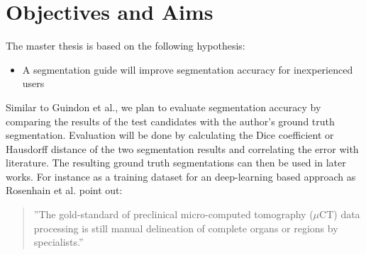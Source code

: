 \section{Objectives and Aims}
\begin{body}
	The master thesis is based on the following hypothesis:
	\begin{itemize}
		\item A segmentation guide will improve segmentation accuracy for inexperienced users
	\end{itemize}
	Similar to Guindon et al.\cite{diceMeasuresAmountEcologic1945}, we plan to evaluate segmentation accuracy by comparing the results of the test candidates with the author's ground truth segmentation. Evaluation will be done by calculating the Dice coefficient\cite{diceMeasuresAmountEcologic1945} or Hausdorff distance\cite{birsanOneHundredYears2006} of the two segmentation results and correlating the error with literature\cite{kenneyHighthroughputSemiautomatedBone2022,malimbanDeepLearningbasedSegmentation2022}. The resulting ground truth segmentations can then be used in later works. For instance as a training dataset for an deep-learning based approach as Rosenhain et al. point out:
	\begin{quotation}
		\noindent
		''The gold-standard of preclinical micro-computed tomography ($\mu$CT) data processing is still manual delineation of complete organs or regions by specialists.''\cite{rosenhainPreclinicalMicrocomputedTomography2018}
	\end{quotation}
\end{body}
\clearpage
